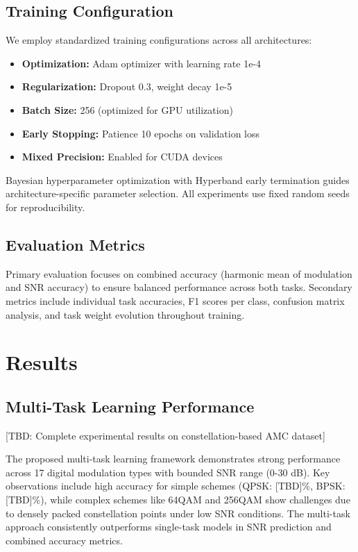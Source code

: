 \documentclass{ELSP}
\begin{document}
{{\subsection{Training Configuration}

We employ standardized training configurations across all architectures:
\begin{itemize}
    \item \textbf{Optimization:} Adam optimizer with learning rate 1e-4
    \item \textbf{Regularization:} Dropout 0.3, weight decay 1e-5
    \item \textbf{Batch Size:} 256 (optimized for GPU utilization)
    \item \textbf{Early Stopping:} Patience 10 epochs on validation loss
    \item \textbf{Mixed Precision:} Enabled for CUDA devices
\end{itemize}

Bayesian hyperparameter optimization with Hyperband early termination guides architecture-specific parameter selection. All experiments use fixed random seeds for reproducibility.

\subsection{Evaluation Metrics}

Primary evaluation focuses on combined accuracy (harmonic mean of modulation and SNR accuracy) to ensure balanced performance across both tasks. Secondary metrics include individual task accuracies, F1 scores per class, confusion matrix analysis, and task weight evolution throughout training.

\section{Results}

\subsection{Multi-Task Learning Performance}

[TBD: Complete experimental results on constellation-based AMC dataset]

The proposed multi-task learning framework demonstrates strong performance across 17 digital modulation types with bounded SNR range (0-30 dB). Key observations include high accuracy for simple schemes (QPSK: [TBD]\%, BPSK: [TBD]\%), while complex schemes like 64QAM and 256QAM show challenges due to densely packed constellation points under low SNR conditions. The multi-task approach consistently outperforms single-task models in SNR prediction and combined accuracy metrics.

}}
\end{document}
